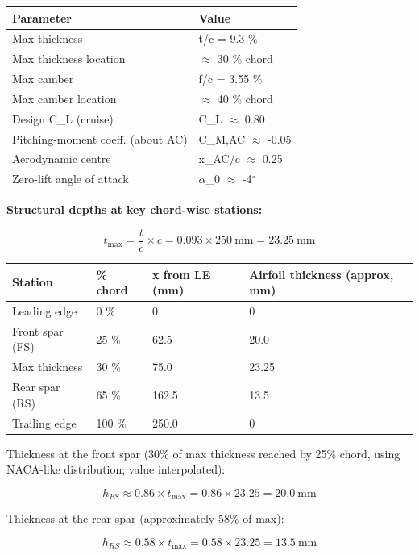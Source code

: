 \documentclass[10pt,a4paper]{article}
\begin{document}
\begin{center}
\begin{tabular}{|l|l|}
\hline
Parameter & Value \\
\hline
Max thickness & t/c = 9.3 \% \\
\hline
Max thickness location & ${\approx}$ 30 \% chord \\
\hline
Max camber & f/c = 3.55 \% \\
\hline
Max camber location & ${\approx}$ 40 \% chord \\
\hline
Design C\_L (cruise) & C\_L ${\approx}$ 0.80 \\
\hline
Pitching-moment coeff. (about AC) & C\_M,AC ${\approx}$ -0.05 \\
\hline
Aerodynamic centre & x\_AC/c ${\approx}$ 0.25 \\
\hline
Zero-lift angle of attack & ${\alpha}$\_0 ${\approx}$ -4$^{\circ}$ \\
\hline
\end{tabular}
\end{center}

\textbf{Structural depths at key chord-wise stations:}

\[
t_{\max} = \frac{t}{c} \times c = 0.093 \times 250\ \text{mm} = 23.25\ \text{mm}
\]

\begin{center}
\begin{tabular}{|l|l|l|l|}
\hline
Station & \% chord & x from LE (mm) & Airfoil thickness (approx, mm) \\
\hline
Leading edge & 0 \% & 0 & 0 \\
\hline
Front spar (FS) & 25 \% & 62.5 & 20.0 \\
\hline
Max thickness & 30 \% & 75.0 & 23.25 \\
\hline
Rear spar (RS) & 65 \% & 162.5 & 13.5 \\
\hline
Trailing edge & 100 \% & 250.0 & 0 \\
\hline
\end{tabular}
\end{center}

Thickness at the front spar (30\% of max thickness reached by 25\% chord, using NACA-like distribution; value interpolated):

\[
h_{FS} \approx 0.86 \times t_{\max} = 0.86 \times 23.25 = 20.0\ \text{mm}
\]

Thickness at the rear spar (approximately 58\% of max):

\[
h_{RS} \approx 0.58 \times t_{\max} = 0.58 \times 23.25 = 13.5\ \text{mm}
\]
\end{document}
